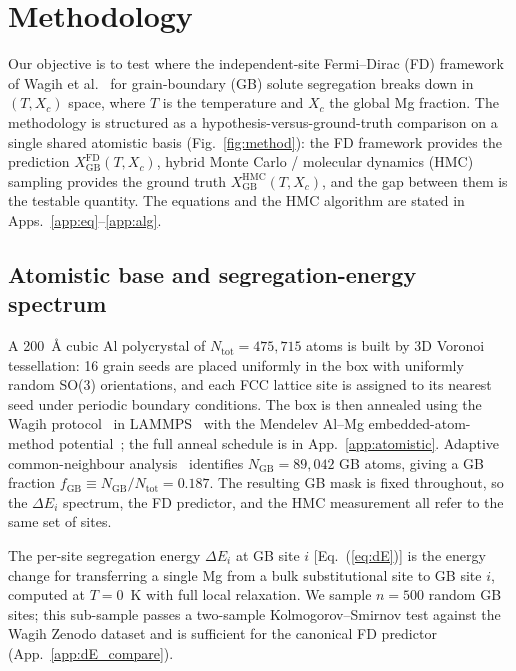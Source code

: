 \section{Methodology}\label{sec:meth}

Our objective is to test where the independent-site Fermi--Dirac (FD)
framework of Wagih et al.~\cite{Wagih2020} for grain-boundary (GB) solute
segregation breaks down in $(T, X_c)$ space, where $T$ is the temperature
and $X_c$ the global Mg fraction. The methodology is structured as a
hypothesis-versus-ground-truth comparison on a single shared atomistic
basis (Fig.~\ref{fig:method}): the FD framework provides the prediction
$X_\mathrm{GB}^\mathrm{FD}(T, X_c)$, hybrid Monte Carlo / molecular
dynamics (HMC) sampling provides the ground truth
$X_\mathrm{GB}^\mathrm{HMC}(T, X_c)$, and the gap between them is the
testable quantity. The equations and the HMC algorithm are stated in
Apps.~\ref{app:eq}--\ref{app:alg}.


\subsection{Atomistic base and segregation-energy spectrum}\label{sec:meth:base}

A 200~\AA{} cubic Al polycrystal of $N_\mathrm{tot} = 475{,}715$ atoms
is built by 3D Voronoi tessellation: 16 grain seeds are placed
uniformly in the box with uniformly random SO(3) orientations, and
each FCC lattice site is assigned to its nearest seed under periodic
boundary conditions. The box is then annealed using the Wagih
protocol~\cite{Wagih2020} in LAMMPS~\cite{LAMMPS} with the Mendelev
Al--Mg embedded-atom-method potential~\cite{Mendelev2009}; the full
anneal schedule is in App.~\ref{app:atomistic}. Adaptive
common-neighbour analysis~\cite{Stukowski2012} identifies
$N_\mathrm{GB} = 89{,}042$ GB atoms, giving a GB fraction
$f_\mathrm{GB} \equiv N_\mathrm{GB}/N_\mathrm{tot} = 0.187$. The
resulting GB mask is fixed throughout, so the $\Delta E_i$ spectrum,
the FD predictor, and the HMC measurement all refer to the same set
of sites.

The per-site segregation energy $\Delta E_i$ at GB site $i$
[Eq.~(\ref{eq:dE})] is the energy change for transferring a single Mg
from a bulk substitutional site to GB site $i$, computed at $T = 0$~K
with full local relaxation. We sample $n = 500$ random GB sites; this
sub-sample passes a two-sample Kolmogorov--Smirnov test against the
Wagih Zenodo dataset and is sufficient for the canonical FD predictor
(App.~\ref{app:dE_compare}).


